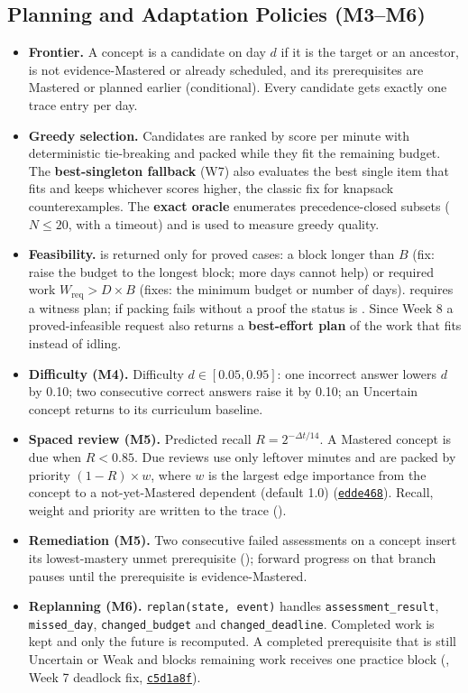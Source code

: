 \documentclass[english]{sintr}
\newcommand{\repourl}{https://github.com/Bhuvan-56/adaptive-learning-path-planner-DAT}
\DeclareRobustCommand{\cm}[1]{\href{\repourl/commit/#1}{\texttt{#1}}}
\begin{document}
\subsection{Planning and Adaptation Policies (M3--M6)}
\begin{itemize}
    \item \textbf{Frontier.} A concept is a candidate on day $d$ if it is the target or an ancestor, is not evidence-Mastered or already scheduled, and its prerequisites are Mastered or planned earlier (conditional). Every candidate gets exactly one trace entry per day.
    \item \textbf{Greedy selection.} Candidates are ranked by score per minute with deterministic tie-breaking and packed while they fit the remaining budget. The \textbf{best-singleton fallback} (W7) also evaluates the best single item that fits and keeps whichever scores higher, the classic fix for knapsack counterexamples. The \textbf{exact oracle} enumerates precedence-closed subsets ($N \leq 20$, with a timeout) and is used to measure greedy quality.
    \item \textbf{Feasibility.}  is returned only for proved cases: a block longer than $B$ (fix: raise the budget to the longest block; more days cannot help) or required work $W_{\text{req}} > D \times B$ (fixes: the minimum budget or number of days).  requires a witness plan; if packing fails without a proof the status is . Since Week 8 a proved-infeasible request also returns a \textbf{best-effort plan} of the work that fits instead of idling.
    \item \textbf{Difficulty (M4).} Difficulty $d \in [0.05, 0.95]$: one incorrect answer lowers $d$ by 0.10; two consecutive correct answers raise it by 0.10; an Uncertain concept returns to its curriculum baseline.
    \item \textbf{Spaced review (M5).} Predicted recall $R = 2^{-\Delta t/14}$. A Mastered concept is due when $R < 0.85$. Due reviews use only leftover minutes and are packed by priority $(1-R)\times w$, where $w$ is the largest edge importance from the concept to a not-yet-Mastered dependent (default 1.0) (\cm{edde468}). Recall, weight and priority are written to the trace ().
    \item \textbf{Remediation (M5).} Two consecutive failed assessments on a concept insert its lowest-mastery unmet prerequisite (); forward progress on that branch pauses until the prerequisite is evidence-Mastered.
    \item \textbf{Replanning (M6).} \texttt{replan(state, event)} handles \texttt{assessment\_result}, \texttt{missed\_day}, \texttt{changed\_budget} and \texttt{changed\_deadline}. Completed work is kept and only the future is recomputed. A completed prerequisite that is still Uncertain or Weak and blocks remaining work receives one practice block (, Week 7 deadlock fix, \cm{c5d1a8f}).
\end{itemize}
\end{document}
